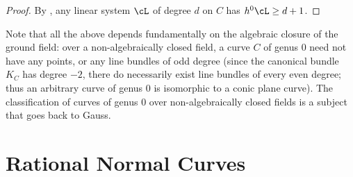 \begin{proof}
 By \trr, any linear system $\cL$ of degree $d$ on $C$ has $h^0\cL \geq d+1$.
\end{proof}

Note that all the above depends fundamentally on the algebraic closure of the ground field: over a non-algebraically closed field, a curve $C$ of genus 0 need not have any points, or any line bundles of odd degree (since the canonical bundle $K_C$ has degree $-2$, there do necessarily exist line bundles of every even degree; thus an arbitrary curve of genus 0 is isomorphic to a conic plane curve). 
The classification of curves of genus 0 over non-algebraically closed fields is a subject that goes back to Gauss.



\section{Rational Normal Curves}

